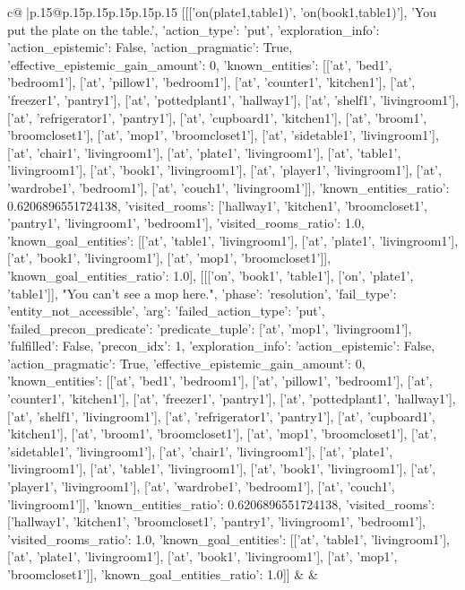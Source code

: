 \documentclass{article}
\begin{document}
{\begin{supertabular}{c@{$\;$}|p{.15\linewidth}@{}p{.15\linewidth}p{.15\linewidth}p{.15\linewidth}p{.15\linewidth}p{.15\linewidth}}
{{{	 [[['on(plate1,table1)', 'on(book1,table1)'], 'You put the plate on the table.', {'action_type': 'put', 'exploration_info': {'action_epistemic': False, 'action_pragmatic': True, 'effective_epistemic_gain_amount': 0, 'known_entities': [['at', 'bed1', 'bedroom1'], ['at', 'pillow1', 'bedroom1'], ['at', 'counter1', 'kitchen1'], ['at', 'freezer1', 'pantry1'], ['at', 'pottedplant1', 'hallway1'], ['at', 'shelf1', 'livingroom1'], ['at', 'refrigerator1', 'pantry1'], ['at', 'cupboard1', 'kitchen1'], ['at', 'broom1', 'broomcloset1'], ['at', 'mop1', 'broomcloset1'], ['at', 'sidetable1', 'livingroom1'], ['at', 'chair1', 'livingroom1'], ['at', 'plate1', 'livingroom1'], ['at', 'table1', 'livingroom1'], ['at', 'book1', 'livingroom1'], ['at', 'player1', 'livingroom1'], ['at', 'wardrobe1', 'bedroom1'], ['at', 'couch1', 'livingroom1']], 'known_entities_ratio': 0.6206896551724138, 'visited_rooms': ['hallway1', 'kitchen1', 'broomcloset1', 'pantry1', 'livingroom1', 'bedroom1'], 'visited_rooms_ratio': 1.0, 'known_goal_entities': [['at', 'table1', 'livingroom1'], ['at', 'plate1', 'livingroom1'], ['at', 'book1', 'livingroom1'], ['at', 'mop1', 'broomcloset1']], 'known_goal_entities_ratio': 1.0}}], [[['on', 'book1', 'table1'], ['on', 'plate1', 'table1']], "You can't see a mop here.", {'phase': 'resolution', 'fail_type': 'entity_not_accessible', 'arg': {'failed_action_type': 'put', 'failed_precon_predicate': {'predicate_tuple': ['at', 'mop1', 'livingroom1'], 'fulfilled': False, 'precon_idx': 1}}, 'exploration_info': {'action_epistemic': False, 'action_pragmatic': True, 'effective_epistemic_gain_amount': 0, 'known_entities': [['at', 'bed1', 'bedroom1'], ['at', 'pillow1', 'bedroom1'], ['at', 'counter1', 'kitchen1'], ['at', 'freezer1', 'pantry1'], ['at', 'pottedplant1', 'hallway1'], ['at', 'shelf1', 'livingroom1'], ['at', 'refrigerator1', 'pantry1'], ['at', 'cupboard1', 'kitchen1'], ['at', 'broom1', 'broomcloset1'], ['at', 'mop1', 'broomcloset1'], ['at', 'sidetable1', 'livingroom1'], ['at', 'chair1', 'livingroom1'], ['at', 'plate1', 'livingroom1'], ['at', 'table1', 'livingroom1'], ['at', 'book1', 'livingroom1'], ['at', 'player1', 'livingroom1'], ['at', 'wardrobe1', 'bedroom1'], ['at', 'couch1', 'livingroom1']], 'known_entities_ratio': 0.6206896551724138, 'visited_rooms': ['hallway1', 'kitchen1', 'broomcloset1', 'pantry1', 'livingroom1', 'bedroom1'], 'visited_rooms_ratio': 1.0, 'known_goal_entities': [['at', 'table1', 'livingroom1'], ['at', 'plate1', 'livingroom1'], ['at', 'book1', 'livingroom1'], ['at', 'mop1', 'broomcloset1']], 'known_goal_entities_ratio': 1.0}}]] 
	  } 
	   } 
	   } 
	 & & \\ 
 


\end{supertabular}}
\end{document}
